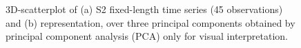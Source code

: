 \documentclass[journal,article,submit,pdftex,moreauthors]{Definitions/mdpi}
\begin{document}
\begin{figure}[H]
\begin{subfigure}[t]{0.5\linewidth}
	\caption{}
	\label{fig:pca_rep}
	\end{subfigure}
	\caption{3D-scatterplot of (a) S2 fixed-length time series (45 observations) and (b) representation, over three principal components obtained by principal component analysis (PCA) only for visual interpretation.}
	\label{fcn_losses}
\end{figure}
\end{document}
